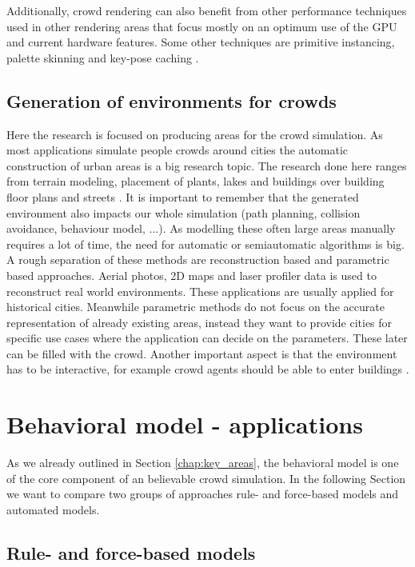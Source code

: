 \documentclass{acmsiggraph}               %
\begin{document}
Additionally, crowd rendering can also benefit from other performance techniques used in other rendering areas that focus mostly on an optimum use of the GPU and current hardware features. Some other techniques are primitive instancing, palette skinning and key-pose caching \cite{beacco_survey_2016}.

\subsection{Generation of environments for crowds}

Here the research is focused on producing areas for the crowd simulation. As most applications simulate people crowds around cities the automatic construction of urban areas is a big research topic. The research done here ranges from terrain modeling, placement of plants, lakes and buildings over building floor plans and streets \cite{berg_computational_2000}. It is important to remember that the generated environment also impacts our whole simulation (path planning, collision avoidance, behaviour model, ...). 
As modelling these often large areas manually requires a lot of time, the need for automatic or semiautomatic algorithms is big. A rough separation of these methods are reconstruction based and parametric based approaches. 
Aerial photos, 2D maps and laser profiler data is used to reconstruct real world environments. These applications are usually applied for historical cities. 
Meanwhile parametric methods do not focus on the accurate representation of already existing areas, instead they want to provide cities for specific use cases where the application can decide on the parameters. These later can be filled with the crowd. Another important aspect is that the environment has to be interactive, for example  crowd agents should be able to enter buildings
\cite{thalmann_crowd_2013}.

\section{Behavioral model - applications}

As we already outlined in Section \ref{chap:key_areas}, the behavioral model is one of the core component of an believable crowd simulation. In the following Section we want to compare two groups of approaches rule- and force-based models and automated models.

\subsection{Rule- and force-based models}
\end{document}
